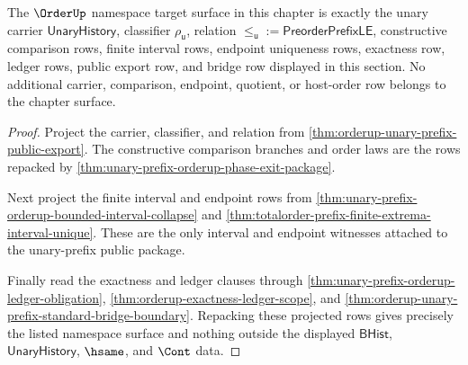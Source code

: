 \begin{theorem}
\label{thm:orderup-unary-prefix-namespace-target-surface}
The $\OrderUp$ namespace target surface in this chapter is exactly the unary carrier $\mathsf{UnaryHistory}$, classifier $\rho_{\mathsf{u}}$, relation $\le_{\mathsf{u}} := \mathsf{PreorderPrefixLE}$, constructive comparison rows, finite interval rows, endpoint uniqueness rows, exactness row, ledger rows, public export row, and bridge row displayed in this section. No additional carrier, comparison, endpoint, quotient, or host-order row belongs to the chapter surface.
\end{theorem}
\begin{proof}
Project the carrier, classifier, and relation from \autoref{thm:orderup-unary-prefix-public-export}. The constructive comparison branches and order laws are the rows repacked by \autoref{thm:unary-prefix-orderup-phase-exit-package}.

Next project the finite interval and endpoint rows from \autoref{thm:unary-prefix-orderup-bounded-interval-collapse} and \autoref{thm:totalorder-prefix-finite-extrema-interval-unique}. These are the only interval and endpoint witnesses attached to the unary-prefix public package.

Finally read the exactness and ledger clauses through \autoref{thm:unary-prefix-orderup-ledger-obligation}, \autoref{thm:orderup-exactness-ledger-scope}, and \autoref{thm:orderup-unary-prefix-standard-bridge-boundary}. Repacking these projected rows gives precisely the listed namespace surface and nothing outside the displayed $\mathsf{BHist}$, $\mathsf{UnaryHistory}$, $\hsame$, and $\Cont$ data.
\end{proof}

